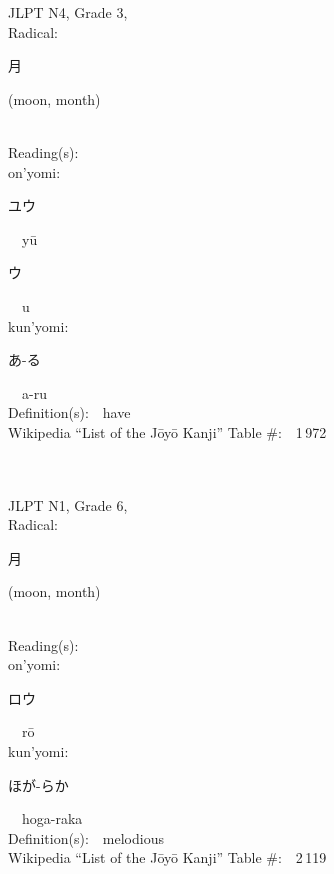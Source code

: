\begin{multicols}{2}
{JLPT N4, Grade 3, \\Radical:\ \ {\begin{CJK}{UTF8}{min} 月 \end{CJK}} (moon, month) } \\
Reading(s):\ \ \\
{\hspace*{1em}}on'yomi:\ \ \\
{\hspace*{2em}}{\begin{CJK}{UTF8}{min} ユウ \end{CJK}}\ \ y\=u\ \ \\
{\hspace*{2em}}{\begin{CJK}{UTF8}{min} ウ \end{CJK}}\ \ u\ \ \\
{\hspace*{1em}}kun'yomi:\ \ \\
{\hspace*{2em}}{\begin{CJK}{UTF8}{min} あ-る \end{CJK}}\ \ a-ru\ \ \\
Definition(s):\ \ have \\
Wikipedia ``List of the J\=oy\=o Kanji'' Table \#:\ \ 1\,972 \\
\ \ \\
{\fontsize{34pt}{40pt}  }\ \ \\  %
{JLPT N1, Grade 6, \\Radical:\ \ {\begin{CJK}{UTF8}{min} 月 \end{CJK}} (moon, month) } \\
Reading(s):\ \ \\
{\hspace*{1em}}on'yomi:\ \ \\
{\hspace*{2em}}{\begin{CJK}{UTF8}{min} ロウ \end{CJK}}\ \ r\=o\ \ \\
{\hspace*{1em}}kun'yomi:\ \ \\
{\hspace*{2em}}{\begin{CJK}{UTF8}{min} ほが-らか \end{CJK}}\ \ hoga-raka\ \ \\
Definition(s):\ \ melodious \\
Wikipedia ``List of the J\=oy\=o Kanji'' Table \#:\ \ 2\,119 \\
\ \ \\
\end{multicols}


